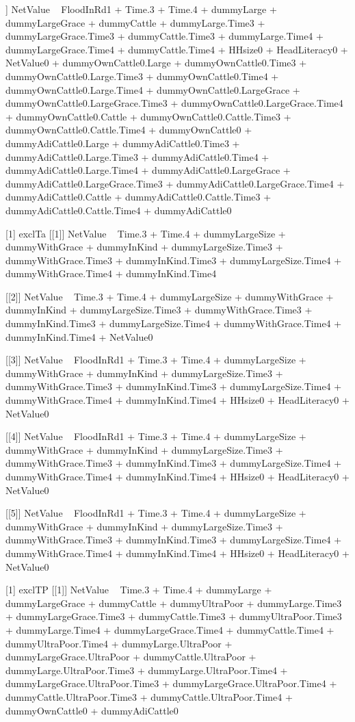 \begin{Schunk}
\begin{Soutput}
[[5]]
NetValue ~ FloodInRd1 + Time.3 + Time.4 + dummyLarge + dummyLargeGrace + 
    dummyCattle + dummyLarge.Time3 + dummyLargeGrace.Time3 + 
    dummyCattle.Time3 + dummyLarge.Time4 + dummyLargeGrace.Time4 + 
    dummyCattle.Time4 + HHsize0 + HeadLiteracy0 + NetValue0 + 
    dummyOwnCattle0.Large + dummyOwnCattle0.Time3 + dummyOwnCattle0.Large.Time3 + 
    dummyOwnCattle0.Time4 + dummyOwnCattle0.Large.Time4 + dummyOwnCattle0.LargeGrace + 
    dummyOwnCattle0.LargeGrace.Time3 + dummyOwnCattle0.LargeGrace.Time4 + 
    dummyOwnCattle0.Cattle + dummyOwnCattle0.Cattle.Time3 + dummyOwnCattle0.Cattle.Time4 + 
    dummyOwnCattle0 + dummyAdiCattle0.Large + dummyAdiCattle0.Time3 + 
    dummyAdiCattle0.Large.Time3 + dummyAdiCattle0.Time4 + dummyAdiCattle0.Large.Time4 + 
    dummyAdiCattle0.LargeGrace + dummyAdiCattle0.LargeGrace.Time3 + 
    dummyAdiCattle0.LargeGrace.Time4 + dummyAdiCattle0.Cattle + 
    dummyAdiCattle0.Cattle.Time3 + dummyAdiCattle0.Cattle.Time4 + 
    dummyAdiCattle0

[1] exclTa
[[1]]
NetValue ~ Time.3 + Time.4 + dummyLargeSize + dummyWithGrace + 
    dummyInKind + dummyLargeSize.Time3 + dummyWithGrace.Time3 + 
    dummyInKind.Time3 + dummyLargeSize.Time4 + dummyWithGrace.Time4 + 
    dummyInKind.Time4

[[2]]
NetValue ~ Time.3 + Time.4 + dummyLargeSize + dummyWithGrace + 
    dummyInKind + dummyLargeSize.Time3 + dummyWithGrace.Time3 + 
    dummyInKind.Time3 + dummyLargeSize.Time4 + dummyWithGrace.Time4 + 
    dummyInKind.Time4 + NetValue0

[[3]]
NetValue ~ FloodInRd1 + Time.3 + Time.4 + dummyLargeSize + dummyWithGrace + 
    dummyInKind + dummyLargeSize.Time3 + dummyWithGrace.Time3 + 
    dummyInKind.Time3 + dummyLargeSize.Time4 + dummyWithGrace.Time4 + 
    dummyInKind.Time4 + HHsize0 + HeadLiteracy0 + NetValue0

[[4]]
NetValue ~ FloodInRd1 + Time.3 + Time.4 + dummyLargeSize + dummyWithGrace + 
    dummyInKind + dummyLargeSize.Time3 + dummyWithGrace.Time3 + 
    dummyInKind.Time3 + dummyLargeSize.Time4 + dummyWithGrace.Time4 + 
    dummyInKind.Time4 + HHsize0 + HeadLiteracy0 + NetValue0

[[5]]
NetValue ~ FloodInRd1 + Time.3 + Time.4 + dummyLargeSize + dummyWithGrace + 
    dummyInKind + dummyLargeSize.Time3 + dummyWithGrace.Time3 + 
    dummyInKind.Time3 + dummyLargeSize.Time4 + dummyWithGrace.Time4 + 
    dummyInKind.Time4 + HHsize0 + HeadLiteracy0 + NetValue0

[1] exclTP
[[1]]
NetValue ~ Time.3 + Time.4 + dummyLarge + dummyLargeGrace + dummyCattle + 
    dummyUltraPoor + dummyLarge.Time3 + dummyLargeGrace.Time3 + 
    dummyCattle.Time3 + dummyUltraPoor.Time3 + dummyLarge.Time4 + 
    dummyLargeGrace.Time4 + dummyCattle.Time4 + dummyUltraPoor.Time4 + 
    dummyLarge.UltraPoor + dummyLargeGrace.UltraPoor + dummyCattle.UltraPoor + 
    dummyLarge.UltraPoor.Time3 + dummyLarge.UltraPoor.Time4 + 
    dummyLargeGrace.UltraPoor.Time3 + dummyLargeGrace.UltraPoor.Time4 + 
    dummyCattle.UltraPoor.Time3 + dummyCattle.UltraPoor.Time4 + 
    dummyOwnCattle0 + dummyAdiCattle0


\end{Soutput}
\end{Schunk}
